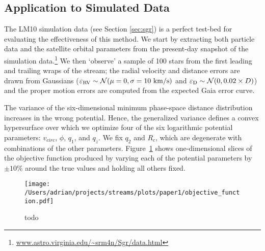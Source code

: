 \documentclass{emulateapj}
\begin{document}
\subsection{Application to Simulated Data} \label{sec:results}
The LM10 simulation data (see Section \ref{sec:sgr}) is a perfect
test-bed for evaluating the effectiveness of this method. We start by
extracting both particle data and the satellite orbital parameters
from the present-day snapshot of the simulation
data.\footnote{\url{www.astro.virginia.edu/~srm4n/Sgr/data.html}} We
then `observe' a sample of 100 stars from the first leading and
trailing wraps of the stream; the radial velocity and distance errors are drawn 
from Gaussians ($\varepsilon_{\rm RV} \sim \mathcal{N}(\mu=0,\sigma=10~{\rm
  km/s})$ and $\varepsilon_{\rm D} \sim \mathcal{N}(0,0.02\times
D)$) and the proper motion errors are computed from the expected Gaia error curve. 

The variance of the six-dimensional minimum phase-space distance distribution increases in the wrong potential. Hence, the generalized variance defines a convex hypersurface over
which we optimize four of the six logarithmic potential parameters:
$v_{circ}$, $\phi$, $q_1$, and $q_z$. We fix $q_2$ and $R_c$, which
are degenerate with combinations of the other
parameters. Figure~\ref{fig:objective} shows one-dimensional slices of
the objective function produced by varying each of the potential
parameters by $\pm10\%$ around the true values and holding all others
fixed.


\begin{figure}[h]
\begin{center}
\texttt{[image: /Users/adrian/projects/streams/plots/paper1/objective\_function.pdf]}
\caption{ todo }\label{fig:objective}
\end{center}
\end{figure}
\end{document}
